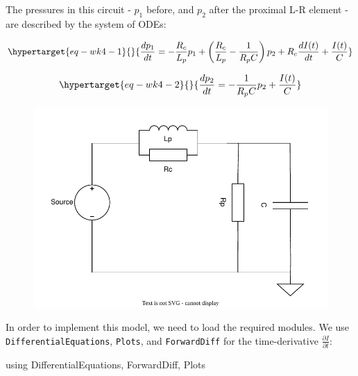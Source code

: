 \documentclass[
  a4paper,
  DIV=11,
  numbers=noendperiod,
  oneside]{scrreprt}
\newenvironment{Shaded}{\begin{snugshade}}{\end{snugshade}}
\newcommand{\BuiltInTok}[1]{\textcolor[rgb]{0.00,0.23,0.31}{#1}}
\newcommand{\ImportTok}[1]{\textcolor[rgb]{0.00,0.46,0.62}{#1}}
\newcommand{\NormalTok}[1]{\textcolor[rgb]{0.00,0.23,0.31}{#1}}
\begin{document}
The pressures in this circuit - \(p_{1}\) before, and \(p_{2}\) after
the proximal L-R element - are described by the system of ODEs:

\begin{equation}\protect\hypertarget{eq-wk4-1}{}{
\frac{d p_{1}}{d t}  =  - \frac{R_{c}}{L_{p}} p_{1} + \left( \frac{R_{c}}{L_{p}} - \frac{1}{R_{p} C} \right) p_{2} 
+ R_{c} \frac{d I(t)}{d t} + \frac{I(t)}{C} 
}\label{eq-wk4-1}\end{equation}

\begin{equation}\protect\hypertarget{eq-wk4-2}{}{
\frac{d p_{2}}{d t}  =  - \frac{1}{R_{p} C} p_{2} + \frac{I(t)}{C} 
}\label{eq-wk4-2}\end{equation}

\begin{figure}


{\centering \includegraphics{ODEsolver_files/mediabag/images/images_for_ODEsolver.qmd/wk4.drawio.pdf}

}

\end{figure}

In order to implement this model, we need to load the required modules.
We use \texttt{DifferentialEquations}, \texttt{Plots}, and
\texttt{ForwardDiff} for the time-derivative
\(\frac{\partial I}{\partial t}\):

\begin{Shaded}
\begin{Highlighting}[]
\ImportTok{using} \BuiltInTok{DifferentialEquations}\NormalTok{, }\BuiltInTok{ForwardDiff}\NormalTok{, }\BuiltInTok{Plots}
\end{Highlighting}
\end{Shaded}
\end{document}
